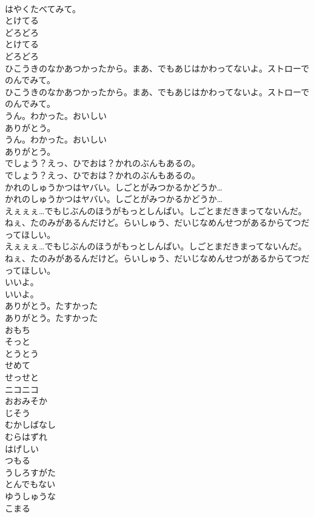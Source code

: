 \documentclass[8pt]{extreport}
\begin{document}
\begin{CJK}{UTF8}{min}
\\	はやくたべてみて。
\\	とけてる
\\	どろどろ
\\	とけてる
\\	どろどろ
\\	ひこうきのなかあつかったから。まあ、でもあじはかわってないよ。ストローでのんでみて。
\\	ひこうきのなかあつかったから。まあ、でもあじはかわってないよ。ストローでのんでみて。
\\	うん。わかった。おいしい
\\	ありがとう。
\\	うん。わかった。おいしい
\\	ありがとう。
\\	でしょう？えっ、ひでおは？かれのぶんもあるの。
\\	でしょう？えっ、ひでおは？かれのぶんもあるの。
\\	かれのしゅうかつはヤバい。しごとがみつかるかどうか…
\\	かれのしゅうかつはヤバい。しごとがみつかるかどうか…
\\	えぇぇぇ…でもじぶんのほうがもっとしんぱい。しごとまだきまってないんだ。ねぇ、たのみがあるんだけど。らいしゅう、だいじなめんせつがあるからてつだってほしい。
\\	えぇぇぇ…でもじぶんのほうがもっとしんぱい。しごとまだきまってないんだ。ねぇ、たのみがあるんだけど。らいしゅう、だいじなめんせつがあるからてつだってほしい。
\\	いいよ。
\\	いいよ。
\\	ありがとう。たすかった
\\	ありがとう。たすかった
\\	おもち
\\	そっと
\\	とうとう
\\	せめて
\\	せっせと
\\	ニコニコ
\\	おおみそか
\\	じそう
\\	むかしばなし
\\	むらはずれ
\\	はげしい
\\	つもる
\\	うしろすがた
\\	とんでもない
\\	ゆうしゅうな
\\	こまる

\end{CJK}
\end{document}
